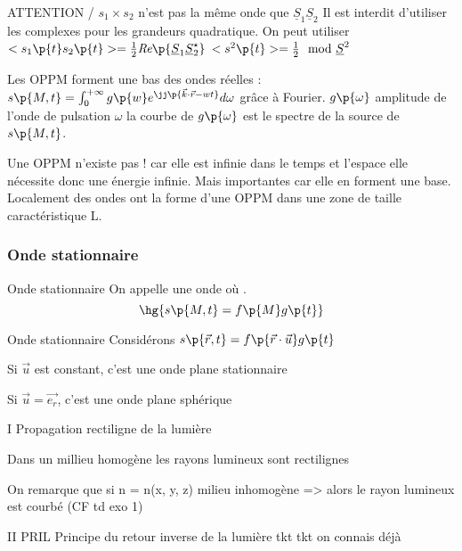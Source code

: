 \begin{psse}
    ATTENTION / $s_1 \times s_2$ n'est pas la même onde que $\underline S_1 \underline S_2$
    Il est interdit d'utiliser les complexes pour les grandeurs quadratique. On peut utiliser $<s_1\p{t}s_2\p{t}> = \frac{1}{2}\textit{Re}\p{\underline S_1 \underline S_2^\star}$
    $<s^2\p{t}> = \frac{1}{2} \mod{\underline S}^2$
        \item Les OPPM forment une bas des ondes réelles :
    $s\p{M, t} = \int_0^{+\infty} g\p{w} e^{\jj \p{\vec k \cdot \vec r - wt}}d\omega$ grâce à Fourier.
    $g\p{\omega}$ amplitude de l'onde de pulsation $\omega$ la courbe de $g\p{\omega}$ est le spectre de la source de $s\p{M,t}$.
        \item Une OPPM n'existe pas !
    car elle est infinie dans le temps et l'espace elle nécessite donc une énergie infinie.
    Mais importantes car elle en forment une base.
    Localement des ondes ont la forme d'une OPPM dans une zone de taille caractéristique L.
    \end{psse}
    
    \subsubsection{Onde stationnaire}
    
    \begin{definition}{Onde stationnaire}{}
        On appelle  une onde où .
        \[ \hg{s\p{M, t} = f\p{M}g\p{t}}\]
    \end{definition}
    
    \begin{example}{Onde stationnaire}{}
        Considérons $s\p{\vec r, t} = f\p{\vec r \cdot \vec u}g\p{t}$
        \begin{enumerate}
            \itt Si $\vec u$ est constant, c'est une onde plane stationnaire
            
            \itt Si $\vec u = \vec{e_r}$, c'est une onde plane sphérique
        \end{enumerate}
    \end{example}

    I Propagation rectiligne de la lumière

    Dans un millieu homogène les rayons lumineux sont rectilignes

    On remarque que si n = n(x, y, z) milieu inhomogène => alors le rayon lumineux est courbé (CF td exo 1)

    II PRIL
    Principe du retour inverse de la lumière
    tkt tkt on connais déjà

